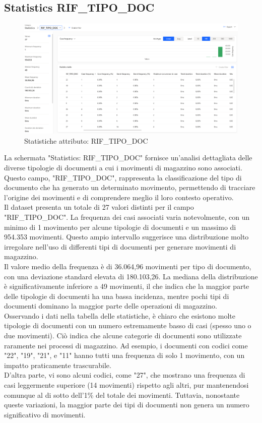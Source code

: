 \documentclass{article}
\begin{document}
\subsection{Statistics RIF\_TIPO\_DOC}
\begin{figure}[H]
    \centering
    \includegraphics[width=\textwidth]{imgMicrosoft/DatiReali/StatisticsRIFTIPODOCDatiReali.png}
    \caption{Statistiche attributo: RIF\_TIPO\_DOC}
    \label{fig:statistics-RIF-TIPO-DOC}
\end{figure}
La schermata "Statistics: RIF\_TIPO\_DOC" fornisce un'analisi dettagliata delle diverse tipologie di documenti a cui i movimenti di magazzino sono associati. Questo campo, "RIF\_TIPO\_DOC", rappresenta la classificazione del tipo di documento che ha generato un determinato movimento, permettendo di tracciare l'origine dei movimenti e di comprendere meglio il loro contesto operativo.\\
Il dataset presenta un totale di 27 valori distinti per il campo "RIF\_TIPO\_DOC". La frequenza dei casi associati varia notevolmente, con un minimo di 1 movimento per alcune tipologie di documenti e un massimo di 954.353 movimenti. Questo ampio intervallo suggerisce una distribuzione molto irregolare nell'uso di differenti tipi di documenti per generare movimenti di magazzino.\\
Il valore medio della frequenza è di 36.064,96 movimenti per tipo di documento, con una deviazione standard elevata di 180.103,26. La mediana della distribuzione è significativamente inferiore a 49 movimenti, il che indica che la maggior parte delle tipologie di documenti ha una bassa incidenza, mentre pochi tipi di documenti dominano la maggior parte delle operazioni di magazzino.\\
Osservando i dati nella tabella delle statistiche, è chiaro che esistono molte tipologie di documenti con un numero estremamente basso di casi (spesso uno o due movimenti). Ciò indica che alcune categorie di documenti sono utilizzate raramente nei processi di magazzino. Ad esempio, i documenti con codici come "22", "19", "21", e "11" hanno tutti una frequenza di solo 1 movimento, con un impatto praticamente trascurabile.\\
D'altra parte, vi sono alcuni codici, come "27", che mostrano una frequenza di casi leggermente superiore (14 movimenti) rispetto agli altri, pur mantenendosi comunque al di sotto dell'1\% del totale dei movimenti. Tuttavia, nonostante queste variazioni, la maggior parte dei tipi di documenti non genera un numero significativo di movimenti.
\end{document}
